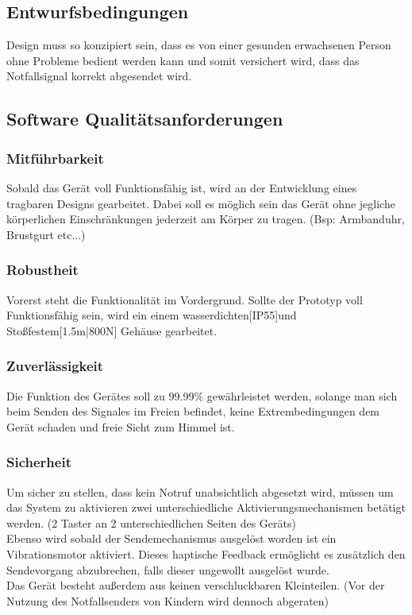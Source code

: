 \subsection{Entwurfsbedingungen}
Design muss so konzipiert sein, dass es von einer gesunden erwachsenen Person ohne Probleme bedient werden kann und 
somit versichert wird, dass das Notfallsignal korrekt abgesendet wird.
\subsection{Software Qualitätsanforderungen}
\subsubsection{Mitführbarkeit}
Sobald das Gerät voll Funktionsfähig ist, wird an der Entwicklung eines tragbaren Designs gearbeitet. Dabei
soll es möglich sein das Gerät ohne jegliche körperlichen Einschränkungen jederzeit am Körper zu tragen.
(Bsp: Armbanduhr, Brustgurt etc...)
\subsubsection{Robustheit}
Vorerst steht die Funktionalität im Vordergrund. Sollte der Prototyp voll Funktionsfähig sein, wird ein einem
wasserdichten[IP55]und Stoßfestem[1.5m|800N] Gehäuse gearbeitet.
\subsubsection{Zuverlässigkeit}
Die Funktion des Gerätes soll zu 99.99{\%} gewährleistet werden, solange man sich beim Senden des Signales im Freien 
befindet, keine Extrembedingungen dem Gerät schaden und freie Sicht zum Himmel ist.
\subsubsection{Sicherheit}
Um sicher zu stellen, dass kein Notruf unabsichtlich abgesetzt wird, müssen um das System zu aktivieren zwei unterschiedliche Aktivierungsmechanismen betätigt werden. (2 Taster an 2 unterschiedlichen Seiten des Geräts)\\
Ebenso wird sobald der Sendemechanismus ausgelöst worden ist ein Vibrationsmotor aktiviert. Dieses haptische Feedback
ermöglicht es zusätzlich den Sendevorgang abzubrechen, falls dieser ungewollt ausgelöst wurde.\\
Das Gerät besteht außerdem aus keinen verschluckbaren Kleinteilen. (Vor der Nutzung des Notfallsenders von Kindern wird dennoch abgeraten) 
